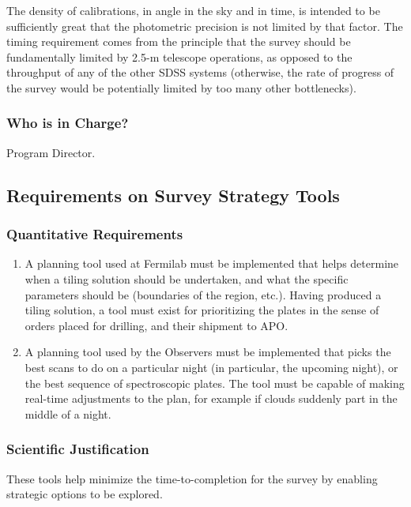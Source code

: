 The density of calibrations, in angle in the sky and in time, is intended to 
be sufficiently great that the photometric precision is not limited by that 
factor.  The timing requirement comes from the principle that the survey 
should be fundamentally limited by 2.5-m telescope operations, as opposed 
to the throughput of any of the other SDSS systems (otherwise, the rate of 
progress of the survey would be potentially limited by too many other 
bottlenecks). 

\subsubsection{Who is in Charge?}

Program Director. 

\subsection{Requirements on Survey Strategy Tools}

\subsubsection{Quantitative Requirements}

\begin{enumerate} 
\item A planning tool used at Fermilab must be implemented that helps determine 
when a tiling solution should be undertaken, and what the specific 
parameters should be (boundaries of the region, etc.).  Having produced a 
tiling solution, a tool must exist for prioritizing the plates in the sense of 
orders placed for drilling, and their shipment to APO. 

\item A planning tool used by the Observers must be implemented that picks the 
best scans to do on a particular night (in particular, the upcoming night), 
or the best sequence of spectroscopic plates.  The tool must be capable of 
making real-time adjustments to the plan, for example if clouds suddenly 
part in the middle of a night. 
\end{enumerate}

\subsubsection{Scientific Justification}

These tools help minimize the time-to-completion for the survey by 
enabling strategic options to be explored. 

